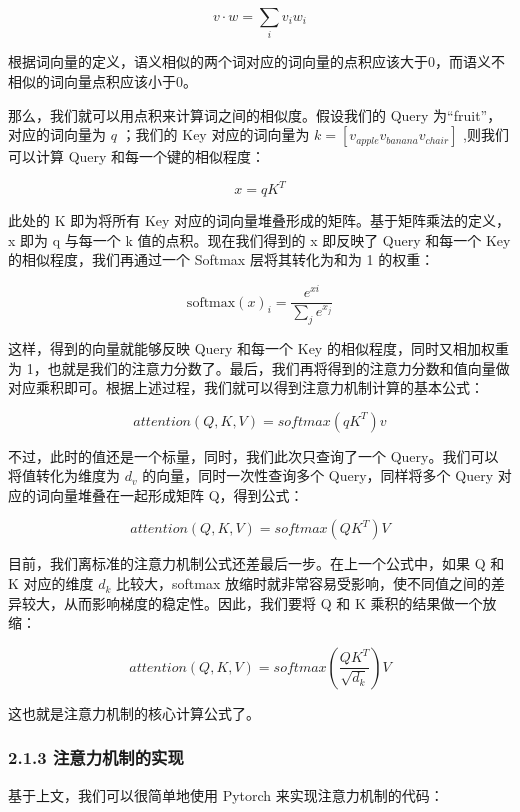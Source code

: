 \documentclass[12pt,a4paper]{book}
\begin{document}
\[
v·w = \sum_{i}v_iw_i
\]

根据词向量的定义，语义相似的两个词对应的词向量的点积应该大于0，而语义不相似的词向量点积应该小于0。

那么，我们就可以用点积来计算词之间的相似度。假设我们的 Query
为``fruit''，对应的词向量为 \(q\) ；我们的 Key 对应的词向量为
\(k = [v_{apple} v_{banana} v_{chair}]\) ,则我们可以计算 Query
和每一个键的相似程度：

\[
x = qK^T
\]

此处的 K 即为将所有 Key
对应的词向量堆叠形成的矩阵。基于矩阵乘法的定义，x 即为 q 与每一个 k
值的点积。现在我们得到的 x 即反映了 Query 和每一个 Key
的相似程度，我们再通过一个 Softmax 层将其转化为和为 1 的权重：

\[
\text{softmax}(x)_i = \frac{e^{xi}}{\sum_{j}e^{x_j}}
\]

这样，得到的向量就能够反映 Query 和每一个 Key
的相似程度，同时又相加权重为
1，也就是我们的注意力分数了。最后，我们再将得到的注意力分数和值向量做对应乘积即可。根据上述过程，我们就可以得到注意力机制计算的基本公式：

\[
attention(Q,K,V) = softmax(qK^T)v
\]

不过，此时的值还是一个标量，同时，我们此次只查询了一个
Query。我们可以将值转化为维度为 \(d_v\) 的向量，同时一次性查询多个
Query，同样将多个 Query 对应的词向量堆叠在一起形成矩阵 Q，得到公式：

\[
attention(Q,K,V) = softmax(QK^T)V
\]

目前，我们离标准的注意力机制公式还差最后一步。在上一个公式中，如果 Q 和
K 对应的维度 \(d_k\) 比较大，softmax
放缩时就非常容易受影响，使不同值之间的差异较大，从而影响梯度的稳定性。因此，我们要将
Q 和 K 乘积的结果做一个放缩：

\[
attention(Q,K,V) = softmax(\frac{QK^T}{\sqrt{d_k}})V
\]

这也就是注意力机制的核心计算公式了。

\subsubsection{2.1.3
注意力机制的实现}\label{ux6ce8ux610fux529bux673aux5236ux7684ux5b9eux73b0}

基于上文，我们可以很简单地使用 Pytorch 来实现注意力机制的代码：
\end{document}

